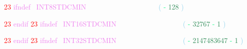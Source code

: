 \documentclass[8, usernames, dvipsnames]{beamer}
\begin{document}
\begin{frame}

 
  \textcolor{Red}{23}
\textcolor{Violet}{ifndef}\textcolor{White}{\ }
\textcolor{Violet}{INT8STDCMIN}
 \textcolor{White}{\ }
\textcolor{White}{\ }
\textcolor{White}{\ }
\textcolor{White}{\ }
\textcolor{White}{\ }
\textcolor{White}{\ }
\textcolor{White}{\ }
\textcolor{White}{\ }
\textcolor{White}{\ }
\textcolor{White}{\ }
\textcolor{White}{\ }
\textcolor{White}{\ }
\textcolor{SkyBlue}{(}
\textcolor{SpringGreen}{-}
\textcolor{SeaGreen}{128}
\textcolor{SkyBlue}{)}

  \textcolor{Red}{23}
\textcolor{Violet}{endif}
  \textcolor{Red}{23}
\textcolor{Violet}{ifndef}\textcolor{White}{\ }
\textcolor{Violet}{INT16STDCMIN}
 \textcolor{White}{\ }
\textcolor{White}{\ }
\textcolor{White}{\ }
\textcolor{White}{\ }
\textcolor{White}{\ }
\textcolor{White}{\ }
\textcolor{White}{\ }
\textcolor{White}{\ }
\textcolor{White}{\ }
\textcolor{White}{\ }
\textcolor{White}{\ }
\textcolor{SkyBlue}{(}
\textcolor{SpringGreen}{-}
\textcolor{SeaGreen}{32767}
\textcolor{SpringGreen}{-}
\textcolor{SeaGreen}{1}
\textcolor{SkyBlue}{)}

  \textcolor{Red}{23}
\textcolor{Violet}{endif}
  \textcolor{Red}{23}
\textcolor{Violet}{ifndef}\textcolor{White}{\ }
\textcolor{Violet}{INT32STDCMIN}
 \textcolor{White}{\ }
\textcolor{White}{\ }
\textcolor{White}{\ }
\textcolor{White}{\ }
\textcolor{White}{\ }
\textcolor{White}{\ }
\textcolor{White}{\ }
\textcolor{White}{\ }
\textcolor{White}{\ }
\textcolor{White}{\ }
\textcolor{White}{\ }
\textcolor{SkyBlue}{(}
\textcolor{SpringGreen}{-}
\textcolor{SeaGreen}{2147483647}
\textcolor{SpringGreen}{-}
\textcolor{SeaGreen}{1}
\textcolor{SkyBlue}{)}

 \end{frame}
\end{document}
